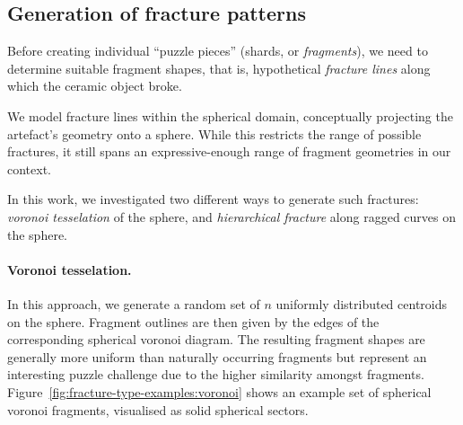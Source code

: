 \documentclass[acmlarge,screen,dvipsnames]{acmart}
\begin{document}
%

%
%

\greenBegin

\subsection{Generation of fracture patterns}
\label{sec:fracture-patterns}

Before creating individual ``puzzle pieces'' (shards,
or \emph{fragments}), we need to determine suitable fragment shapes, that
is, hypothetical \emph{fracture lines} along which the ceramic object broke.

We model fracture lines within the spherical domain, conceptually
projecting the artefact's geometry onto a sphere. While this restricts the
range of possible fractures, it still spans an expressive-enough range
of fragment geometries in our context.

In this work, we investigated two different ways to generate such
fractures: \emph{voronoi tesselation} of the sphere, and
\emph{hierarchical fracture} along ragged curves on the sphere.

\paragraph{Voronoi tesselation.}
%
In this approach, we generate a random set of $n$ uniformly
distributed centroids on the sphere. Fragment outlines are then given
by the edges of the corresponding spherical voronoi diagram.
%
The resulting fragment shapes are generally more uniform than
naturally occurring fragments but represent an interesting
puzzle challenge due to the higher similarity amongst fragments.
%
Figure~\ref{fig:fracture-type-examples:voronoi} shows an example set
of spherical voronoi fragments, visualised as solid spherical sectors.
\end{document}
